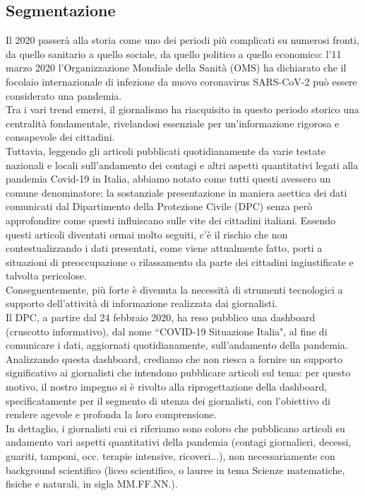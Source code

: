 \subsection{Segmentazione}
Il 2020 passerà alla storia come uno dei periodi più complicati su numerosi fronti, da quello sanitario a quello sociale, 
da quello politico a quello economico: l'11 marzo 2020 l'Organizzazione Mondiale della Sanità (OMS) ha dichiarato che il 
focolaio internazionale di infezione da nuovo coronavirus SARS-CoV-2 può essere considerato una pandemia.\\
Tra i vari trend emersi, il giornalismo ha riacquisito in questo periodo storico una centralità fondamentale, rivelandosi 
essenziale per un'informazione rigorosa e consapevole dei cittadini.\\
Tuttavia, leggendo gli articoli pubblicati quotidianamente da varie testate nazionali e locali sull'andamento dei contagi 
e altri aspetti quantitativi legati alla pandemia Covid-19 in Italia, abbiamo notato come tutti questi avessero un comune 
denominatore: la sostanziale presentazione in maniera asettica dei dati comunicati dal Dipartimento della Protezione Civile 
(DPC) senza però approfondire come questi influiscano sulle vite dei cittadini italiani. Essendo questi articoli diventati 
ormai molto seguiti, c'è il rischio che non contestualizzando i dati presentati, come viene attualmente fatto, porti a 
situazioni di preoccupazione o rilassamento da parte dei cittadini ingiustificate e talvolta pericolose.\\
Conseguentemente, più forte è divenuta la necessità di strumenti tecnologici a supporto dell'attività di informazione 
realizzata dai giornalisti.\\
Il DPC, a partire dal 24 febbraio 2020, ha reso pubblico una dashboard (cruscotto informativo), dal nome ``COVID-19 Situazione Italia", 
al fine di comunicare i dati, aggiornati quotidianamente, sull'andamento della pandemia.\\
Analizzando questa dashboard, crediamo che non riesca a fornire un supporto significativo ai giornalisti che intendono pubblicare 
articoli sul tema: per questo motivo, il nostro impegno si è rivolto alla riprogettazione della dashboard, specificatamente per il 
segmento di utenza dei giornalisti, con l'obiettivo di rendere agevole e profonda la loro comprensione.\\
In dettaglio, i giornalisti cui ci riferiamo sono coloro che pubblicano articoli su andamento vari aspetti quantitativi della 
pandemia (contagi giornalieri, decessi, guariti, tamponi, occ. terapie intensive, ricoveri...), non necessariamente con 
background scientifico (liceo scientifico, o lauree in tema Scienze matematiche, fisiche e naturali, in sigla MM.FF.NN.).